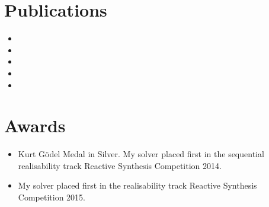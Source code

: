 \documentclass[a4paper,twoside,openright,11pt,oldfontcommands]{memoir}
\theoremstyle{definition}
\begin{document}
\begin{abstract}
The proposed techniques are implemented in a new tool called Termite-2 and evaluated by synthesising drivers for a number of I/O devices representative of a typical embedded platform. Termite-2 is the first tool to combine the power of automation with the flexibility of conventional development. It is also the first practical synthesis tool based on abstraction refinement. Finally, it is the first synthesis tool to support automated debugging of input specifications.

\end{abstract}
\clearpage


\tableofcontents
\clearpage

\listoffigures

\listoftables

\chapter{Publications}
\begin{itemize}
    \item {}
    \item {}
    \item {}
    \item {}
    \item {}
\end{itemize}

{\let\clearpage\relax\chapter*{Awards}}
\begin{itemize}
    \item Kurt G{\"o}del Medal in Silver. My solver placed first in the sequential realisability track Reactive Synthesis Competition 2014. 
    \item My solver placed first in the realisability track Reactive Synthesis Competition 2015. 
\end{itemize}

\mainmatter















\appendix




%

\backmatter
\cleardoublepage


\end{document}
